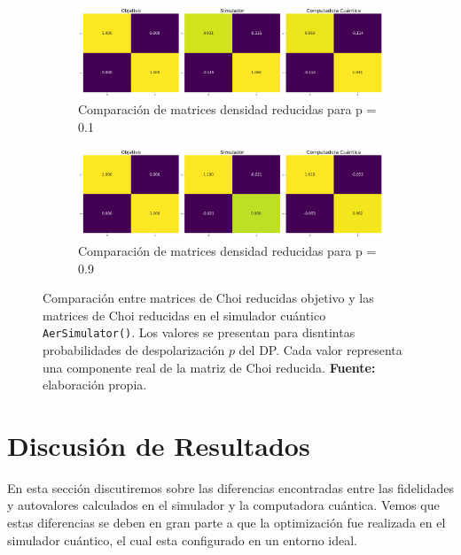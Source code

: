 \documentclass[letterpaper,12pt]{thesisECFM}
\theoremstyle{plain}
\theoremstyle{definition}
\theoremstyle{definition}
\theoremstyle{remark}
\newcommand{\1}{\mathbb{1}}
\begin{document}
\begin{figure}[h!] %
    \centering
    \begin{subfigure}{\textwidth}
        \centering
        \includegraphics[width=0.9\linewidth]{imagenes/ident_comp_0.1.png}
        \caption{Comparación de matrices densidad reducidas para p = 0.1}
        \label{fig:ident_comp_p0.1}
    \end{subfigure}
    \vspace{1em} %
    
   
    \begin{subfigure}{\textwidth}
        \centering
        \includegraphics[width=0.9\linewidth]{imagenes/ident_comp_0.9.png}
        \caption{Comparación de matrices densidad reducidas para p = 0.9}
        \label{fig:ident_comp_p0.9}
    \end{subfigure}
 \caption{Comparación entre matrices de Choi reducidas objetivo  y  las matrices de Choi reducidas en el simulador cuántico \texttt{AerSimulator()}. Los valores se presentan para disntintas probabilidades de despolarización $p$ del DP. Cada valor representa una componente real de la matriz de Choi reducida. \textbf{Fuente:} elaboración propia.}
    \label{fig:ident_comp}
\end{figure}


\section{Discusión de Resultados} %
\label{sec:discusion_dp}
En esta sección discutiremos sobre las diferencias encontradas entre las
fidelidades y autovalores calculados en el simulador y la computadora cuántica.
Vemos que estas diferencias se deben en gran parte a que la optimización fue
realizada en el simulador cuántico, el cual esta configurado en un entorno
ideal. 
\end{document}
